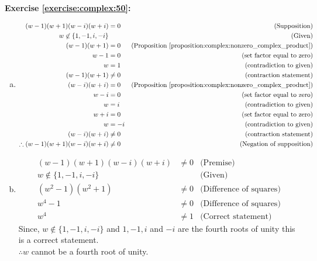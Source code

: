 \noindent\textbf{Exercise \ref{exercise:complex:50}:} %
\begin{enumerate}[(a)]
\item
\begin{align*}
(w - 1)(w + 1)(w - i)(w + i) &= 0		&\text{(Supposition)}\\
w \not\in \{1, -1, i, -i\} &	&\text{(Given)}\\
(w - 1)(w + 1) &= 0 		&\text{(Proposition \ref{proposition:complex:nonzero_complex_product})}\\
w - 1 &= 0		&\text{(set factor equal to zero)}\\
w &= 1		&\text{(contradiction to given)}\\
(w - 1)(w + 1) &\neq 0		&\text{(contraction statement)}\\
(w - i)(w + i) &= 0 		&\text{(Proposition \ref{proposition:complex:nonzero_complex_product})}\\
w - i &= 0		&\text{(set factor equal to zero)}\\
w &= i		&\text{(contradiction to given)}\\
w + i &= 0		&\text{(set factor equal to zero)}\\
w &= -i		&\text{(contradiction to given)}\\
(w - i)(w + i) &\neq 0		&\text{(contraction statement)}\\
\therefore (w - 1)(w + 1)(w - i)(w + i) &\neq 0	&\text{(Negation of supposition)}
\end{align*}

\item
\begin{align*}
(w - 1)(w + 1)(w - i)(w + i) &\neq 0	&\text{(Premise)}\\
w \not\in \{1, -1, i, -i\} &	&\text{(Given)}\\
(w^{2} - 1)(w^{2} + 1) &\neq 0 		&\text{(Difference of squares)}\\
w^{4} - 1 &\neq 0		&\text{(Difference of squares)}\\
w^{4} &\neq 1		&\text{(Correct statement)}
\end{align*}
Since, $w \not\in \{1, -1, i, -i\}$ and $1, -1, i$ and $-i$ are the fourth roots of unity this is a correct statement.\\
$\therefore w$ cannot be a fourth root of unity.
\end{enumerate}

